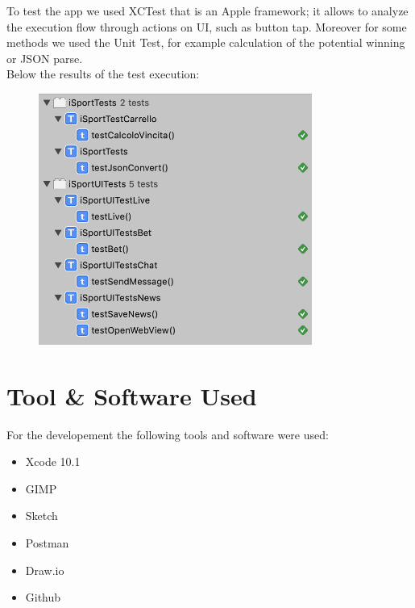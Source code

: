 \documentclass[numbers=noenddot, 12pt, a4paper, oneside]{scrbook}
\begin{document}
To test the app we used XCTest that is an Apple framework; it allows to analyze the execution flow through actions on UI, such as button tap. Moreover for some methods we used the Unit Test, for example calculation of the potential winning or JSON parse.\\

Below the results of the test execution:
\begin{figure}[H]
	\centering
	\includegraphics[width=0.8\textwidth]{images/TestUnit}
\end{figure}
\chapter{Tool \& Software Used}
For the developement the following tools and software were used:
\begin{itemize}
	\item Xcode 10.1
	\item GIMP
	\item Sketch
	\item Postman
	\item Draw.io
	\item Github
\end{itemize}
\end{document}
